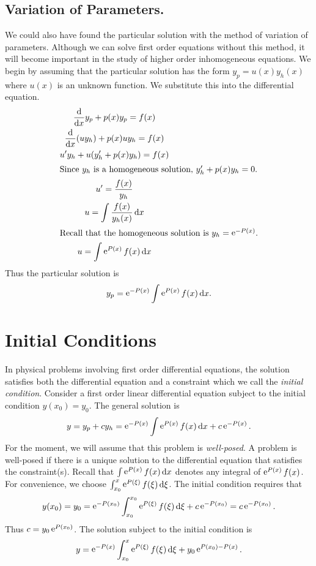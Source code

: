 \subsection{Variation of Parameters.}


We could also have found the particular solution with the method of 
variation of parameters. 
Although we can solve first order equations without this method, it will
become important in the study of higher order inhomogeneous equations.
We begin by assuming that the particular solution has the form 
$y_p = u(x) y_h(x)$ where $u(x)$ is an unknown function.  
We substitute this into the differential equation.
\begin{gather*}
  \frac{\mathrm{d}}{\mathrm{d} x} y_p + p(x) y_p = f(x) \\
  \frac{\mathrm{d}}{\mathrm{d} x} (u y_h) + p(x) u y_h = f(x) \\
  u' y_h + u (y_h' + p(x) y_h) = f(x) \\
  \intertext{Since $y_h$ is a homogeneous solution, $y_h' + p(x) y_h = 0$.}
  u' = \frac{f(x)}{y_h} \\
  u = \int \frac{f(x)}{y_h(x)}\,\mathrm{d} x \\
  \intertext{Recall that the homogeneous solution is $y_h = \mathop{\mathrm{e}}\nolimits^{-P(x)}$.}
  u = \int \mathop{\mathrm{e}}\nolimits^{P(x)}f(x)\,\mathrm{d} x
\end{gather*}
Thus the particular solution is
\[ 
y_p = \mathop{\mathrm{e}}\nolimits^{-P(x)} \int \mathop{\mathrm{e}}\nolimits^{P(x)}f(x)\,\mathrm{d} x.
\]









\section{Initial Conditions}




In physical problems involving first order differential equations, 
the solution satisfies both the differential equation and a constraint which 
we call the \textit{initial condition}.
Consider a first order linear differential equation subject to
the initial condition $y(x_0) = y_0$.  
The general solution is
\[ 
y = y_p + c y_h = \mathop{\mathrm{e}}\nolimits^{-P(x)} \int \mathop{\mathrm{e}}\nolimits^{P(x)} f(x) \,\mathrm{d} x + c \mathop{\mathrm{e}}\nolimits^{-P(x)}. 
\]
For the moment, we will assume that this problem is \textit{well-posed}.  
A problem is well-posed if there is a unique solution to the differential 
equation that satisfies the constraint(s).
Recall that $\int \mathop{\mathrm{e}}\nolimits^{P(x)}f(x)\,\mathrm{d} x$ denotes any integral of $\mathop{\mathrm{e}}\nolimits^{P(x)} f(x)$.
For convenience, we choose $\int^x_{x_0} \mathop{\mathrm{e}}\nolimits^{P(\xi)}f(\xi)\,\mathrm{d} \xi$.  The initial
condition requires that
\[
y(x_0) = y_0 
= \mathop{\mathrm{e}}\nolimits^{-P(x_0)}\int^{x_0}_{x_0} \mathop{\mathrm{e}}\nolimits^{P(\xi)}f(\xi)\,\mathrm{d} \xi + c \mathop{\mathrm{e}}\nolimits^{-P(x_0)}
= c \mathop{\mathrm{e}}\nolimits^{-P(x_0)}.
\]
Thus $c = y_0 \mathop{\mathrm{e}}\nolimits^{P(x_0)}$. The solution subject to the initial condition is
\[
y = \mathop{\mathrm{e}}\nolimits^{-P(x)}\int^x_{x_0} \mathop{\mathrm{e}}\nolimits^{P(\xi)}f(\xi)\,\mathrm{d}\xi + y_0 \mathop{\mathrm{e}}\nolimits^{P(x_0)-P(x)}.
\]







